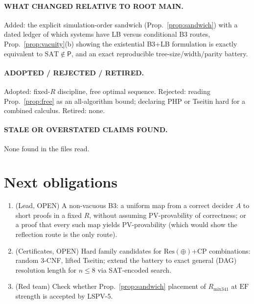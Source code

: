 \documentclass[11pt]{article}
\theoremstyle{definition}
\newcommand{\SAT}{\mathrm{SAT}}
\newcommand{\Res}{\mathrm{Res}}
\newcommand{\EF}{\mathrm{EF}}
\begin{document}
\paragraph{WHAT CHANGED RELATIVE TO ROOT MAIN.} Added: the explicit
simulation-order sandwich (Prop.~\ref{prop:sandwich}) with a dated ledger of
which systems have LB versus conditional B3 routes, Prop.~\ref{prop:vacuity}(b)
showing the existential B3+LB formulation is exactly equivalent to
$\SAT\notin\mathsf P$, and an exact reproducible tree-size/width/parity battery.
\paragraph{ADOPTED / REJECTED / RETIRED.} Adopted: fixed-$R$ discipline,
free optimal sequence. Rejected: reading Prop.~\ref{prop:free} as an
all-algorithm bound; declaring PHP or Tseitin hard for a combined calculus.
Retired: none.
\paragraph{STALE OR OVERSTATED CLAIMS FOUND.} None found in the files read.

\section{Next obligations}
\begin{enumerate}
\item (Lead, OPEN) A non-vacuous B3: a uniform map from a correct decider $A$
to short proofs in a fixed $R$, without assuming PV-provability of correctness;
or a proof that every such map yields PV-provability (which would show the
reflection route is the only route).
\item (Certificates, OPEN) Hard family candidates for $\Res(\oplus)$+CP
combinations: random 3-CNF, lifted Tseitin; extend the battery to exact
general (DAG) resolution length for $n\le 8$ via SAT-encoded search.
\item (Red team) Check whether Prop.~\ref{prop:sandwich} placement of
$R_{\mathrm{mix341}}$ at $\EF$ strength is accepted by LSPV-5.
\end{enumerate}
\end{document}

